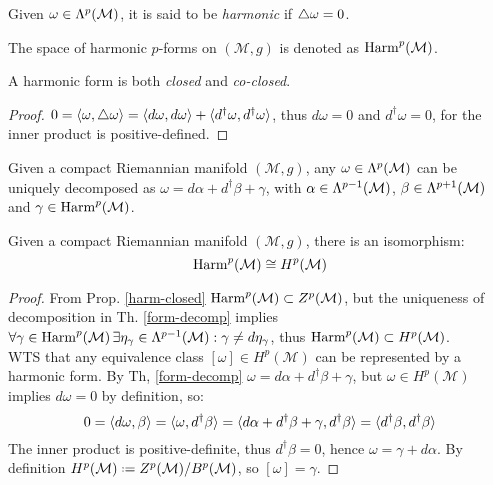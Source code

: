 \begin{definition}
  Given $ \omega \in \Lambda^{p}(\mathcal{M}) $, it is said to be \textit{harmonic} if $ \triangle \omega = 0 $.
\end{definition}

\begin{definition}
  The space of harmonic $ p $-forms on $ (\mathcal{M},g) $ is denoted as $ \mathrm{Harm}^{p}(\mathcal{M}) $.
\end{definition}

\begin{proposition}\label{harm-closed}
  A harmonic form is both \textit{closed} and \textit{co-closed}.
\end{proposition}
\begin{proof}
  $ 0 = \braket{\omega, \triangle \omega} = \braket{d\omega, d\omega} + \braket{d^{\dagger} \omega, d^{\dagger}{\omega}} $, thus $ d\omega = 0 $ and $ d^{\dagger} \omega = 0 $, for the inner product is positive-defined.
\end{proof}

\begin{theorem}\label{form-decomp}
  Given a compact Riemannian manifold $ (\mathcal{M},g) $, any $ \omega \in \Lambda^{p}(\mathcal{M}) $ can be uniquely decomposed as $ \omega = d\alpha + d^{\dagger}\beta + \gamma $, with $ \alpha \in \Lambda^{p-1}(\mathcal{M}) $, $ \beta \in \Lambda^{p+1}(\mathcal{M}) $ and $ \gamma \in \mathrm{Harm}^{p}(\mathcal{M}) $.
\end{theorem}

\begin{theorem}[Hodge]
  Given a compact Riemannian manifold $ (\mathcal{M},g) $, there is an isomorphism:
  \begin{equation}
    \mathrm{Harm}^{p}(\mathcal{M}) \cong H^p(\mathcal{M})
    \label{eq:3.23}
  \end{equation}
\end{theorem}
\begin{proof}
  From Prop. \ref{harm-closed} $ \mathrm{Harm}^{p}(\mathcal{M}) \subset Z^p(\mathcal{M}) $, but the uniqueness of decomposition in Th. \ref{form-decomp} implies $ \forall \gamma \in \mathrm{Harm}^{p}(\mathcal{M}) \,\exists \eta_{\gamma} \in \Lambda^{p-1}(\mathcal{M}) : \gamma \neq d\eta_{\gamma} $, thus $ \mathrm{Harm}^{p}(\mathcal{M}) \subset H^p(\mathcal{M}) $. \\
  WTS that any equivalence class $ [\omega] \in H^p(\mathcal{M}) $ can be represented by a harmonic form. By Th, \ref{form-decomp} $ \omega = d\alpha + d^{\dagger}\beta + \gamma $, but $ \omega \in H^p(\mathcal{M}) $ implies $ d\omega = 0 $ by definition, so:
  \begin{equation*}
    0 = \braket{d\omega, \beta} = \braket{\omega, d^{\dagger} \beta} = \braket{d\alpha + d^{\dagger}\beta + \gamma, d^{\dagger}\beta} = \braket{d^{\dagger} \beta, d^{\dagger} \beta}
  \end{equation*}
  The inner product is positive-definite, thus $ d^{\dagger} \beta = 0 $, hence $ \omega = \gamma + d\alpha $. By definition $ H^p(\mathcal{M}) \defeq Z^p(\mathcal{M}) / B^p(\mathcal{M}) $, so $ [\omega] = \gamma $.
\end{proof}










